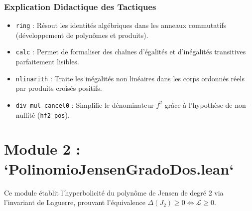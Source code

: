 \documentclass[11pt,a4paper]{article}
\theoremstyle{definition}
\theoremstyle{remark}
\begin{document}
\subsubsection*{Explication Didactique des Tactiques}
\begin{itemize}
    \item \texttt{ring} : Résout les identités algébriques dans les anneaux commutatifs (développement de polynômes et produits).
    \item \texttt{calc} : Permet de formaliser des chaînes d'égalités et d'inégalités transitives parfaitement lisibles.
    \item \texttt{nlinarith} : Traite les inégalités non linéaires dans les corps ordonnés réels par produits croisés positifs.
    \item \texttt{div\_mul\_cancel0} : Simplifie le dénominateur $f^2$ grâce à l'hypothèse de non-nullité (\texttt{hf2\_pos}).
\end{itemize}

\section{Module 2 : `PolinomioJensenGradoDos.lean`}

Ce module établit l'hyperbolicité du polynôme de Jensen de degré 2 via l'invariant de Laguerre, prouvant l'équivalence $\Delta(J_2) \ge 0 \iff \mathcal{L} \ge 0$.
\end{document}
